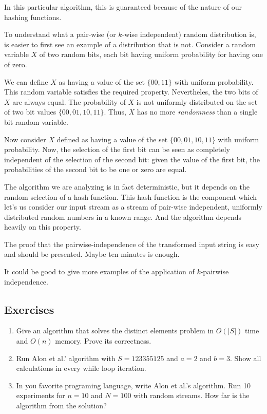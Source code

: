\documentclass[12pt]{article}
\begin{document}
In this particular algorithm, this is guaranteed because of the nature of our hashing functions.

To understand what a pair-wise (or $k$-wise independent)  random distribution is, is easier to first see an example of a distribution that is not. 
Consider a  random variable $X$ of two random bits, each bit having uniform probability for having one of zero.

We can define $X$ as having a value of the set $\{00,11\}$ with uniform probability. This random variable satisfies the required property. Nevertheles, the two bits of $X$ are always equal. The probability of $X$ is not uniformly distributed on the set of two bit values $\{00,01,10,11\}$.
Thus, $X$ has no more \emph{randomness} than a single bit random variable.

Now consider $X$ defined as having a value of the set $\{00,01,10,11\}$ with uniform probability. Now, the selection of the first bit can be seen as completely independent of the selection of the second bit: given the value of the first bit, the probabilities  of the second bit to be one or zero are equal.

The algorithm we are analyzing is in fact deterministic, but it depends on the random selection of a hash function. This hash function is the component which let's us consider our input stream as a stream of pair-wise independent, uniformly distributed random numbers in a known range. And the algorithm depends heavily on this property.

The proof that the pairwise-independence of the transformed input string is easy and should be presented. Maybe ten minutes is enough.
 
It could be good to give more examples of the application of $k$-pairwise independence.




\subsection{Exercises}


\begin{enumerate}

\item Give an algorithm that solves the distinct elements problem in $O(|S|)$ time
and $O(n)$ memory. Prove its correctness.

\item Run Alon et al.' algorithm with $S = 1 2 3 3 5 5 1 2 5$ and $a=2$ and $b=3$.
Show all calculations in every while loop iteration.

\item In you favorite programing language, write Alon et al.'s algorithm. 
Run 10 experiments for $n=10$ and $N=100$ with random streams.
How far is the algorithm from the solution?  
\end{enumerate}
\end{document}
